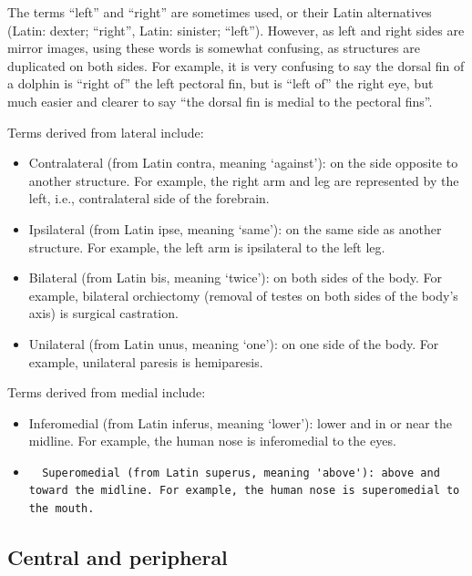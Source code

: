 \documentclass[]{book}
\providecommand{\tightlist}{%
  \setlength{\itemsep}{0pt}\setlength{\parskip}{0pt}}
\begin{document}
The terms ``left'' and ``right'' are sometimes used, or their Latin alternatives (Latin: dexter; ``right'', Latin: sinister; ``left''). However, as left and right sides are mirror images, using these words is somewhat confusing, as structures are duplicated on both sides. For example, it is very confusing to say the dorsal fin of a dolphin is ``right of'' the left pectoral fin, but is ``left of'' the right eye, but much easier and clearer to say ``the dorsal fin is medial to the pectoral fins''.

Terms derived from lateral include:

\begin{itemize}
\tightlist
\item
  Contralateral (from Latin contra, meaning `against'): on the side opposite to another structure. For example, the right arm and leg are represented by the left, i.e., contralateral side of the forebrain.
\item
  Ipsilateral (from Latin ipse, meaning `same'): on the same side as another structure. For example, the left arm is ipsilateral to the left leg.
\item
  Bilateral (from Latin bis, meaning `twice'): on both sides of the body. For example, bilateral orchiectomy (removal of testes on both sides of the body's axis) is surgical castration.
\item
  Unilateral (from Latin unus, meaning `one'): on one side of the body. For example, unilateral paresis is hemiparesis.
\end{itemize}

Terms derived from medial include:

\begin{itemize}
\item
  Inferomedial (from Latin inferus, meaning `lower'): lower and in or near the midline. For example, the human nose is inferomedial to the eyes.
\item
\begin{verbatim}
  Superomedial (from Latin superus, meaning 'above'): above and toward the midline. For example, the human nose is superomedial to the mouth.
\end{verbatim}
\end{itemize}

\hypertarget{central-and-peripheral}{%
\subsection{Central and peripheral}\label{central-and-peripheral}}
\end{document}
